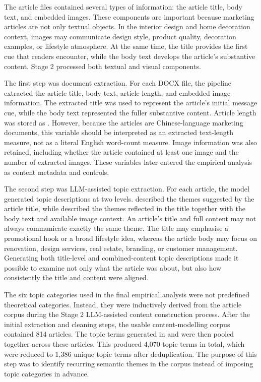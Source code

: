 The article files contained several types of information: the article title, body text, and embedded images. These components are important because marketing articles are not only textual objects. In the interior design and home decoration context, images may communicate design style, product quality, decoration examples, or lifestyle atmosphere. At the same time, the title provides the first cue that readers encounter, while the body text develops the article’s substantive content. Stage 2 processed both textual and visual components.

The first step was document extraction. For each DOCX file, the pipeline extracted the article title, body text, article length, and embedded image information. The extracted title was used to represent the article’s initial message cue, while the body text represented the fuller substantive content. Article length was stored as . However, because the articles are Chinese-language marketing documents, this variable should be interpreted as an extracted text-length measure, not as a literal English word-count measure. Image information was also retained, including whether the article contained at least one image and the number of extracted images. These variables later entered the empirical analysis as content metadata and controls.

The second step was LLM-assisted topic extraction. For each article, the model generated topic descriptions at two levels.  described the themes suggested by the article title, while  described the themes reflected in the title together with the body text and available image context. An article’s title and full content may not always communicate exactly the same theme. The title may emphasise a promotional hook or a broad lifestyle idea, whereas the article body may focus on renovation, design services, real estate, branding, or customer management. Generating both title-level and combined-content topic descriptions made it possible to examine not only what the article was about, but also how consistently the title and content were aligned.

The six topic categories used in the final empirical analysis were not predefined theoretical categories. Instead, they were inductively derived from the article corpus during the Stage 2 LLM-assisted content construction process. After the initial extraction and cleaning steps, the usable content-modelling corpus contained 814 articles. The topic terms generated in  and  were then pooled together across these articles. This produced 4,070 topic terms in total, which were reduced to 1,386 unique topic terms after deduplication. The purpose of this step was to identify recurring semantic themes in the corpus instead of imposing topic categories in advance.

